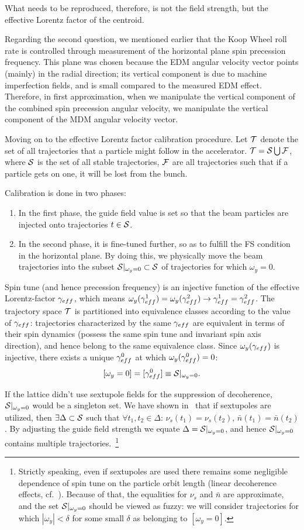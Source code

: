 \documentclass[a4paper]{jacow}
\newcommand{\w}{\omega}
\newcommand{\nbar}{\bar n}
\newcommand{\D}{\Delta}
\begin{document}
What needs to be reproduced, therefore, is not the field strength, but the effective Lorentz factor of the centroid.

Regarding the second question, we mentioned earlier that the Koop Wheel roll rate
is controlled through measurement of the horizontal plane spin precession frequency. 
This plane was chosen because the EDM angular velocity vector points
(mainly) in the radial direction; its vertical component is due to machine imperfection fields, and is small compared to
the measured EDM effect. Therefore, in first approximation, when we manipulate the vertical component of the 
combined spin precession angular velocity, we manipulate the vertical component of the MDM angular velocity vector.

Moving on to the effective Lorentz factor calibration procedure.
Let $\mathcal T$ denote the set of all trajectories that a particle might follow in the accelerator.
$\Traj = \Stab \bigcup \Fail$, where $\Stab$ is the set of all stable trajectories, $\mathcal F$ are all trajectories
such that if a particle gets on one, it will be lost from the bunch.

Calibration is done in two phases:
\begin{enumerate}
\item In the first phase, the guide field value is set so that the beam particles are injected onto trajectories
  $t\in\Stab$.
\item In the second phase, it is fine-tuned further, so as to fulfill the FS condition in the horizontal plane.
  By doing this, we physically move the beam trajectories into the subset $\Stab*\subset\Stab$ of trajectories 
  for which $\w_y = 0$.
\end{enumerate}

Spin tune (and hence precession frequency) is an injective function of the
effective Lorentz-factor $\g*$, which means
$\w_y(\g*^1) = \w_y(\g*^2) \rightarrow \g*^1 = \g*^2$. The trajectory space $\mathcal T$ is partitioned into equivalence
classes according to the value of $\g*$: trajectories characterized by the same $\g*$ are equivalent
in terms of their spin dynamics (possess the same spin tune and invariant spin axis direction),
and hence belong to the same equivalence class.
Since $\w_y(\g*)$ is injective, there exists a unique $\g*^0$ at which $\w_y(\g*^0)=0$:
\[
[\w_y=0] = [\g*^0] \equiv \Stab*.
\]

If the lattice didn't use sextupole fields for the suppression of decoherence,
$\Stab*$ would be a singleton set. We have shown in~\cite{Aksentev:IPAC19:Decoh} that if sextupoles are
utilized, then $\exists\D\subset\Stab$ such that $\forall t_1,t_2\in\D$:
$\nu_s(t_1) = \nu_s(t_2)$, $\nbar(t_1) = \nbar(t_2)$. By adjusting the guide field strength we equate
$\D=\Stab*$, and hence $\Stab*$ contains multiple trajectories.~\footnote{Strictly speaking,
  even if sextupoles are used there remains some negligible dependence of spin tune
  on the particle orbit length (linear decoherence effects, cf.~\cite{Aksentev:IPAC19:Decoh}).
  Because of that, the equalities for $\nu_s$ and $\nbar$ are approximate, and the set $\Stab*$
  should be viewed as fuzzy:
  we will consider trajectories for which $|\w_y|<\delta$ for some small $\delta$ as belonging to $[\w_y=0]$.}
\end{document}
